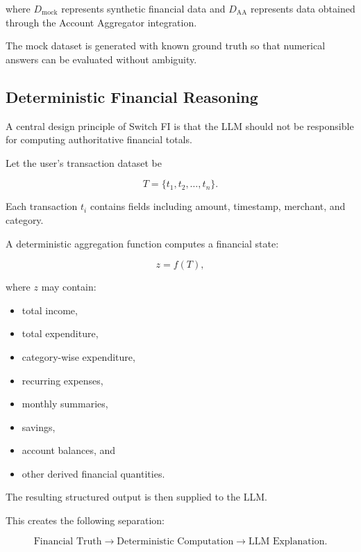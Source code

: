 \documentclass[conference]{IEEEtran}
\begin{document}
    where $D_{\mathrm{mock}}$ represents synthetic financial data and
    $D_{\mathrm{AA}}$ represents data obtained through the Account Aggregator
    integration.
    
    The mock dataset is generated with known ground truth so that numerical
    answers can be evaluated without ambiguity.
    
    \subsection{Deterministic Financial Reasoning}
    
    A central design principle of Switch FI is that the LLM should not be
    responsible for computing authoritative financial totals.
    
    Let the user's transaction dataset be
    
    \begin{equation}
    T = \{t_1,t_2,\ldots,t_n\}.
    \end{equation}
    
    Each transaction $t_i$ contains fields including amount, timestamp,
    merchant, and category.
    
    A deterministic aggregation function computes a financial state:
    
    \begin{equation}
    z = f(T),
    \end{equation}
    
    where $z$ may contain:
    
    \begin{itemize}
        \item total income,
        \item total expenditure,
        \item category-wise expenditure,
        \item recurring expenses,
        \item monthly summaries,
        \item savings,
        \item account balances, and
        \item other derived financial quantities.
    \end{itemize}
    
    The resulting structured output is then supplied to the LLM.
    
    This creates the following separation:
    
    \begin{equation}
    \text{Financial Truth} \rightarrow
    \text{Deterministic Computation} \rightarrow
    \text{LLM Explanation}.
    \end{equation}
    
\end{document}
